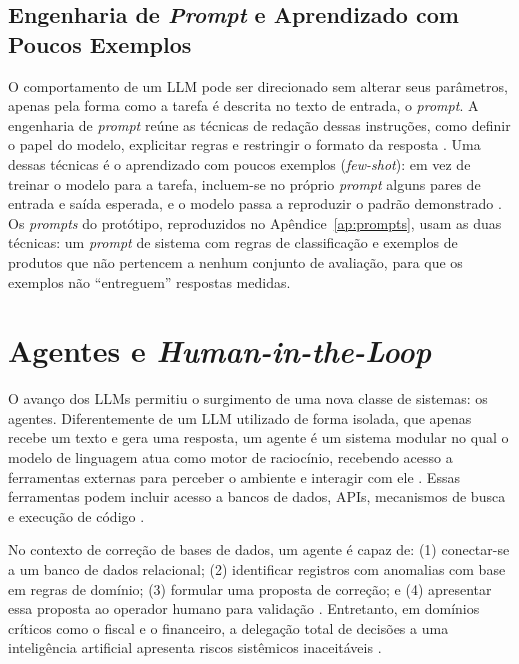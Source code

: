 \subsection{Engenharia de \textit{Prompt} e Aprendizado com Poucos Exemplos}

O comportamento de um LLM pode ser direcionado sem alterar seus parâmetros, apenas pela forma como a tarefa é descrita no texto de entrada, o \textit{prompt}. A engenharia de \textit{prompt} reúne as técnicas de redação dessas instruções, como definir o papel do modelo, explicitar regras e restringir o formato da resposta \cite{liu2023prompt}. Uma dessas técnicas é o aprendizado com poucos exemplos (\textit{few-shot}): em vez de treinar o modelo para a tarefa, incluem-se no próprio \textit{prompt} alguns pares de entrada e saída esperada, e o modelo passa a reproduzir o padrão demonstrado \cite{brown2020fewshot}. Os \textit{prompts} do protótipo, reproduzidos no Apêndice~\ref{ap:prompts}, usam as duas técnicas: um \textit{prompt} de sistema com regras de classificação e exemplos de produtos que não pertencem a nenhum conjunto de avaliação, para que os exemplos não ``entreguem'' respostas medidas.

\section{Agentes e \textit{Human-in-the-Loop}}

O avanço dos LLMs permitiu o surgimento de uma nova classe de sistemas: os agentes. Diferentemente de um LLM utilizado de forma isolada, que apenas recebe um texto e gera uma resposta, um agente é um sistema modular no qual o modelo de linguagem atua como motor de raciocínio, recebendo acesso a ferramentas externas para perceber o ambiente e interagir com ele \cite{Wang2023LLMAgentsSurvey}. Essas ferramentas podem incluir acesso a bancos de dados, APIs, mecanismos de busca e execução de código \cite{qu2024toollearning}.

No contexto de correção de bases de dados, um agente é capaz de: (1) conectar-se a um banco de dados relacional; (2) identificar registros com anomalias com base em regras de domínio; (3) formular uma proposta de correção; e (4) apresentar essa proposta ao operador humano para validação \cite{Roychowdhury2025NLIDB}. Entretanto, em domínios críticos como o fiscal e o financeiro, a delegação total de decisões a uma inteligência artificial apresenta riscos sistêmicos inaceitáveis \cite{pohler2025}.

